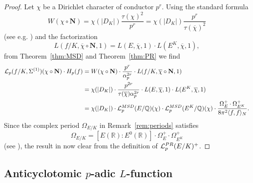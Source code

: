 \documentclass[a4paper,10pt]{amsart}
\numberwithin{equation}{section}
\numberwithin{equation}{section}
\theoremstyle{plain}
\theoremstyle{definition}
\theoremstyle{definition}
\theoremstyle{plain}
\theoremstyle{plain}
\theoremstyle{plain}
\theoremstyle{plain}
\newcommand{\Q}{\mathbb{Q}}
\newcommand{\R}{\mathbb{R}}
\newcommand{\Lcal}{\mathcal{L}}
\begin{document}
\begin{proof}
Let $\chi$ be a Dirichlet character of conductor $p^r$. Using the standard formula 
\[
W(\chi\circ\mathbf{N})=\chi(\vert D_K\vert)\frac{\tau(\chi)^2}{p^r}=\chi(\vert D_K\vert)\frac{p^r}{\tau(\overline{\chi})^2}
\]
(see e.g. \cite[Lem.~4.8.1]{miyake}) and the factorization
\[
L(f/K,\overline{\chi}\circ\mathbf{N},1)=L(E,\overline{\chi},1)\cdot L(E^K,\overline{\chi},1),
\]
from Theorem~\ref{thm:MSD} and Theorem~\ref{thm:PR} we find
\[
\begin{aligned}
\Lcal_p(f/K,\Sigma^{(1)})(\chi\circ\mathbf{N})\cdot H_p(f)&=W(\chi\circ\mathbf{N})\cdot\frac{p^r}{\alpha_p^{2r}}\cdot L(f/K,\overline{\chi}\circ\mathbf{N},1)\\
&=\chi(\vert D_K\vert)\cdot\frac{p^{2r}}{\tau(\overline{\chi})\alpha_p^{2r}}\cdot L(E,\overline{\chi},1)\cdot L(E^K,\overline{\chi},1)\\
&=\chi(\vert D_K\vert)\cdot\Lcal_p^{\rm MSD}(E/\Q)(\chi)\cdot\Lcal_p^{\rm MSD}(E^K/\Q)(\chi)\cdot\frac{\Omega_E^+\cdot\Omega_{E^K}^+}{8\pi^2\langle f,f\rangle_N}.
\end{aligned}
\]
Since the complex period $\Omega_{E/K}$ in Remark~\ref{rem:periods} satisfies
\[
\Omega_{E/K}=[E(\R):E^0(\R)]\cdot\Omega_E^+\cdot\Omega_{E^K}^+
\]
(see \cite[\S{V.2}]{grosszagier}), the result in now clear from the definition of $\Lcal_p^{\rm PR}(E/K)^+$.
%
\end{proof}

\subsection{Anticyclotomic $p$-adic $L$-function}
\label{subsec:L-ac} 
\end{document}
